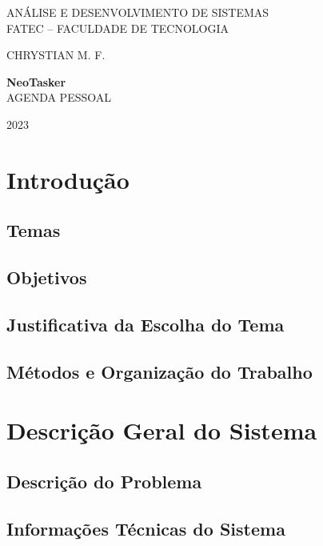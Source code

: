 \documentclass[a4paper,12pt]{article}
\begin{document}
\begin{titlingpage}
\begin{center}
    {\large
        \vspace{3cm}
        ANÁLISE E DESENVOLVIMENTO DE SISTEMAS \\
        FATEC -- FACULDADE DE TECNOLOGIA

        \vspace{3cm}
        CHRYSTIAN M. F.

        \vspace{4cm}
        {\Huge \textbf{NeoTasker}} \\
        AGENDA PESSOAL

        \vspace{8cm}
        2023
    }
\end{center}
\end{titlingpage}
\addto{}
\tableofcontents
\thispagestyle{empty}
\pagebreak
\section{Introdução}
\subsection{Temas}
\subsection{Objetivos}
\subsection{Justificativa da Escolha do Tema}
\subsection{Métodos e Organização do Trabalho}
\pagebreak
\section{Descrição Geral do Sistema}
\subsection{Descrição do Problema}
\subsection{Informações Técnicas do Sistema}
\end{document}
